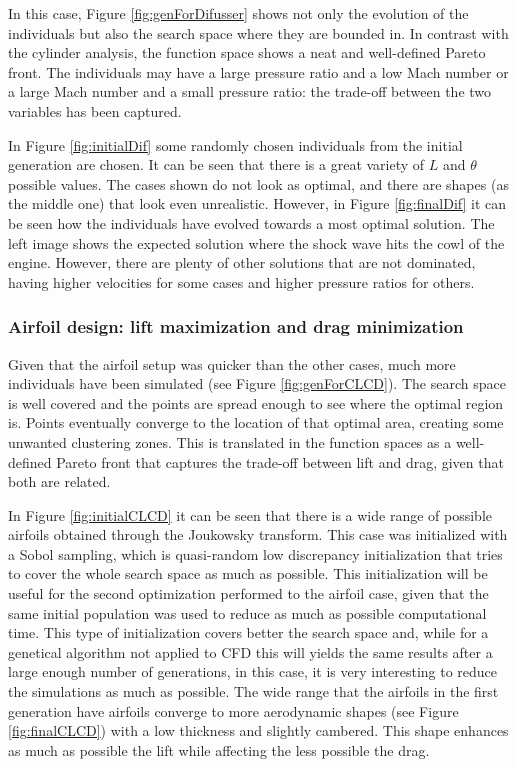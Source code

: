 In this case, Figure \ref{fig:genForDifusser} shows not only the evolution of the individuals but also the search space where they are bounded in. In contrast with the cylinder analysis, the function space shows a neat and well-defined Pareto front. The individuals may have a large pressure ratio and a low Mach number or a large Mach number and a small pressure ratio: the trade-off between the two variables has been captured.

In Figure \ref{fig:initialDif} some randomly chosen individuals from the initial generation are chosen. It can be seen that there is a great variety of $L$ and $\theta$ possible values. The cases shown do not look as optimal, and there are shapes (as the middle one) that look even unrealistic. However, in Figure \ref{fig:finalDif} it can be seen how the individuals have evolved towards a most optimal solution. The left image shows the expected solution where the shock wave hits the cowl of the engine. However, there are plenty of other solutions that are not dominated, having higher velocities for some cases and higher pressure ratios for others. 

\subsubsection*{Airfoil design: lift maximization and drag minimization}


Given that the airfoil setup was quicker than the other cases, much more individuals have been simulated (see Figure \ref{fig:genForCLCD}). The search space is well covered and the points are spread enough to see where the optimal region is. Points eventually converge to the location of that optimal area, creating some unwanted clustering zones. This is translated in the function spaces as a well-defined Pareto front that captures the trade-off between lift and drag, given that both are related. 

In Figure \ref{fig:initialCLCD} it can be seen that there is a wide range of possible airfoils obtained through the Joukowsky transform. This case was initialized with a Sobol sampling, which is quasi-random low discrepancy initialization that tries to cover the whole search space as much as possible. This initialization will be useful for the second optimization performed to the airfoil case, given that the same initial population was used to reduce as much as possible computational time. This type of initialization covers better the search space and, while for a genetical algorithm not applied to CFD this will yields the same results after a large enough number of generations, in this case, it is very interesting to reduce the simulations as much as possible. The wide range that the airfoils in the first generation have airfoils converge to more aerodynamic shapes (see Figure \ref{fig:finalCLCD}) with a low thickness and slightly cambered. This shape enhances as much as possible the lift while affecting the less possible the drag. 


